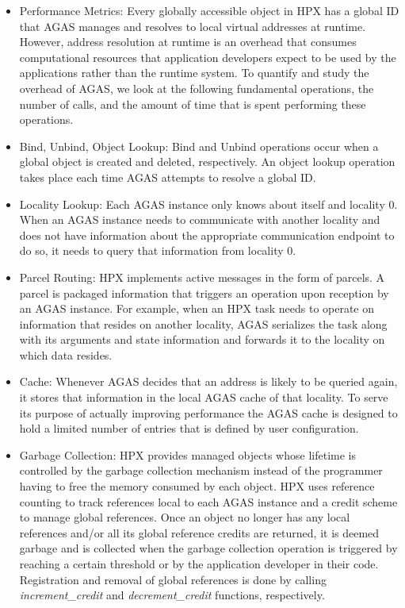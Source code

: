 \begin{itemize}
\item{Performance Metrics}:
Every globally accessible object in HPX has a global ID that AGAS manages and
resolves to local virtual addresses at runtime. However, address resolution at runtime is
an overhead that consumes computational resources that application developers expect to be used by the
applications rather than the runtime system. To quantify and study the overhead of AGAS, we look at the following
fundamental operations, the number of calls, and the amount of time that is
spent performing these operations.

\item{Bind, Unbind, Object Lookup}:
Bind and Unbind operations occur when a global object is created and deleted, 
respectively. An object lookup operation takes place each time AGAS attempts 
to resolve a global ID.

\item{Locality Lookup}:
Each AGAS instance only knows about itself and locality 0. When an AGAS
instance needs to communicate with another locality and does not have
information about the appropriate communication endpoint to do so, it needs to
query that information from locality 0.

\item{Parcel Routing}:
HPX implements active messages in the form of parcels\cite{wagle2018methodology}. A parcel is packaged
information that triggers an operation upon reception by an AGAS instance. For
example, when an HPX task needs to operate on information that resides on
another locality, AGAS serializes the task along with its arguments and state
information and forwards it to the locality on which data resides.

\item{Cache}:
Whenever AGAS decides that an address is likely to be queried again, it stores
that information in the local AGAS cache of that locality. To serve its purpose of actually improving
performance the AGAS cache is designed to hold a limited number of entries that is
defined by user configuration.

\item{Garbage Collection}:
\label{sec:garbage_collection}
HPX provides managed objects whose lifetime is controlled by the garbage
collection mechanism instead of the programmer having to free the memory
consumed by each object. HPX uses reference counting to track references local
to each AGAS instance and a credit scheme to manage global references. Once an
object no longer has any local references and/or all its global reference
credits are returned, it is deemed garbage and is collected when the garbage
collection operation is triggered by reaching a certain threshold or by the
application developer in their code. Registration and removal of global references is done by
calling \textit{increment\_credit} and \textit{decrement\_credit} functions, respectively.
\end{itemize}
